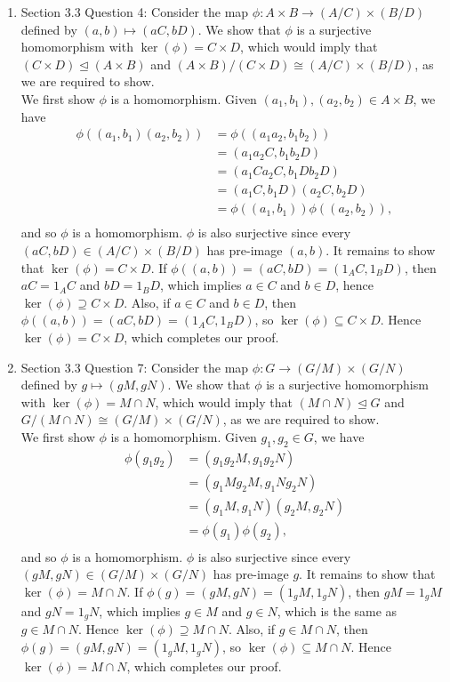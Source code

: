 \documentclass{article}
\begin{document}
\begin{enumerate}
  \item Section 3.3 Question 4: Consider the map $\phi:A\times
    B\rightarrow(A/C)\times(B/D)$ defined by $(a,b)\mapsto(aC,bD)$. We show
    that $\phi$ is a surjective homomorphism with $\ker(\phi)=C\times D$,
    which would imply that $(C\times D)\trianglelefteq(A\times B)$ and
    $(A\times B)/(C\times D)\cong(A/C)\times(B/D)$, as we are required to
    show. \\

    We first show $\phi$ is a homomorphism. Given $(a_1,b_1),(a_2,b_2)\in
    A\times B$, we have
    \begin{align*}
      \phi((a_1,b_1)(a_2,b_2))  &= \phi((a_1a_2,b_1b_2))  \\
                                &= (a_1a_2C,b_1b_2D)      \\
                                &= (a_1Ca_2C,b_1Db_2D)    \\
                                &= (a_1C,b_1D)(a_2C,b_2D) \\
                                &= \phi((a_1,b_1))\phi((a_2,b_2)),  \\
    \end{align*}
    and so $\phi$ is a homomorphism. $\phi$ is also surjective since every
    $(aC,bD)\in(A/C)\times(B/D)$ has pre-image $(a,b)$. It remains to show
    that $\ker(\phi)=C\times D$. If $\phi((a,b))=(aC,bD)=(1_AC,1_BD)$, then
    $aC=1_AC$ and $bD=1_BD$, which implies $a\in C$ and $b\in D$, hence
    $\ker(\phi)\supseteq C\times D$. Also, if $a\in C$ and $b\in D$, then
    $\phi((a,b))=(aC,bD)=(1_AC,1_BD)$, so $\ker(\phi)\subseteq C\times D$.
    Hence $\ker(\phi)=C\times D$, which completes our proof.

  \item Section 3.3 Question 7: Consider the map $\phi:G
    \rightarrow(G/M)\times(G/N)$ defined by $g\mapsto(gM,gN)$. We show
    that $\phi$ is a surjective homomorphism with $\ker(\phi)=M\cap N$,
    which would imply that $(M\cap N)\trianglelefteq G$ and $G/(M\cap
    N)\cong(G/M)\times(G/N)$, as we are required to show. \\

    We first show $\phi$ is a homomorphism. Given $g_1,g_2\in G$, we have
    \begin{align*}
      \phi(g_1g_2)  &= (g_1g_2M,g_1g_2N)      \\
                    &= (g_1Mg_2M,g_1Ng_2N)    \\
                    &= (g_1M,g_1N)(g_2M,g_2N) \\
                    &= \phi(g_1)\phi(g_2),    \\
    \end{align*}
    and so $\phi$ is a homomorphism. $\phi$ is also surjective since every
    $(gM,gN)\in(G/M)\times(G/N)$ has pre-image $g$. It remains to show
    that $\ker(\phi)=M\cap N$. If $\phi(g)=(gM,gN)=(1_gM,1_gN)$, then
    $gM=1_gM$ and $gN=1_gN$, which implies $g\in M$ and $g\in N$, which is
    the same as $g\in M\cap N$. Hence
    $\ker(\phi)\supseteq M\cap N$. Also, if $g\in M\cap N$, then
    $\phi(g)=(gM,gN)=(1_gM,1_gN)$, so $\ker(\phi)\subseteq M\cap N$.
    Hence $\ker(\phi)=M\cap N$, which completes our proof.


\end{enumerate}
\end{document}
